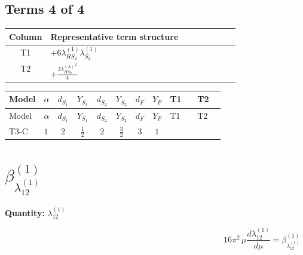 \documentclass[8pt]{article}
\begin{document}
\begin{landscape}
\subsection*{Terms 4 of 4}
\begin{center}
\begin{tabular}{@{}c >{\raggedright\arraybackslash}p{0.82\linewidth}@{}}
\toprule
Column & Representative term structure \\
\midrule
T1 & \(\displaystyle +6 {\lambda_{HS_2}^{(1)}} {\lambda_{S_2}^{(1)}}\) \\
\midrule
T2 & \(\displaystyle +\frac{3 {\lambda_{HS_2}^{(A)}}^2}{4}\) \\
\midrule
\bottomrule
\end{tabular}
\end{center}
\smallskip
\tiny
\begin{longtable}{@{}llcccccc >{\raggedright\arraybackslash}p{0.21\linewidth} >{\raggedright\arraybackslash}p{0.21\linewidth}@{}}
\toprule
Model & $\alpha$ & $d_{S_1}$ & $Y_{S_1}$ & $d_{S_2}$ & $Y_{S_2}$ & $d_F$ & $Y_F$ & T1 & T2 \\
\midrule
\endfirsthead
\toprule
Model & $\alpha$ & $d_{S_1}$ & $Y_{S_1}$ & $d_{S_2}$ & $Y_{S_2}$ & $d_F$ & $Y_F$ & T1 & T2 \\
\midrule
\endhead
T3-C & $1$ & $2$ & $\frac{1}{2}$ & $2$ & $\frac{3}{2}$ & $3$ & $1$ & \scriptsize\adjustbox{max width=\linewidth}{$\begin{gathered} +6 {\lambda_{HS_2}^{(1)}} {\lambda_{S_2}^{(1)}}\end{gathered}$} & \scriptsize\adjustbox{max width=\linewidth}{$\begin{gathered} +\frac{3 {\lambda_{HS_2}^{(A)}}^2}{4}\end{gathered}$} \\
\midrule
\bottomrule
\end{longtable}
\clearpage
\section*{$\beta_{\lambda_{12}^{(1)}}^{(1)}$}
\noindent\textbf{Quantity: }$\lambda_{12}^{(1)}$\par\smallskip
\[16\pi^2\,\mu\frac{d \lambda_{12}^{(1)}}{d\mu}=\beta_{\lambda_{12}^{(1)}}^{(1)}\]

\end{landscape}
\end{document}
